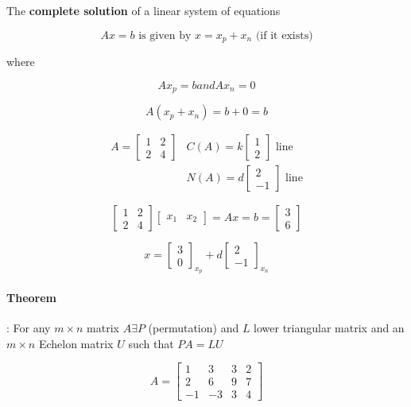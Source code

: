 \documentclass[12pt]{article}
\newcommand{\<}{\langle}
\renewcommand{\>}{\rangle}
\begin{document}
The \textbf{complete solution} of a linear system of equations

\[
	 Ax=b \text{ is given by } x = x_p + x_n \text{ (if it exists)}
\]

where

\[
	Ax_p = b and Ax_n = 0
\]

\[
	A(x_p + x_n) = b + 0 = b
\]

\[
	\begin{matrix}
		A = \begin{bmatrix}
			1 & 2 \\ 2 & 4
		\end{bmatrix} &
		C(A) = k \begin{bmatrix}
			1 \\ 2
		\end{bmatrix} \text{ line}\\
		& N(A) = d \begin{bmatrix}
			2 \\ -1
		\end{bmatrix} \text{ line}
	\end{matrix}
\]

\[
	\begin{bmatrix}
		1 & 2 \\ 2 & 4
	\end{bmatrix}
	\begin{bmatrix}
		x_1 & x_2
	\end{bmatrix} = Ax  = b = \begin{bmatrix}
		3 \\ 6
	\end{bmatrix}
\]

\[
	x = \begin{bmatrix}
		3 \\ 0
	\end{bmatrix}_{x_{p}} + d \begin{bmatrix}
		2 \\ -1
	\end{bmatrix}_{x_{n}}
\]

\paragraph{Theorem}: For any $m \times n$ matrix $A \exists P$ (permutation) and $L$ lower triangular matrix and an $m \times n$ Echelon matrix $U$ such that $PA = LU$

\[
	A = \begin{bmatrix}
		1 & 3 & 3 & 2 \\
		2 & 6 & 9 & 7 \\
		-1 & -3 & 3 & 4
	\end{bmatrix}
\]
\end{document}
